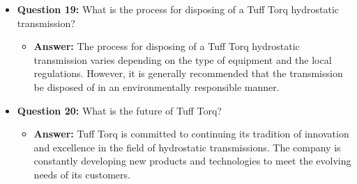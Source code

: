 \documentclass{article}
\begin{document}
\begin{itemize}
    \item \textbf{Question 19:} What is the process for disposing of a Tuff Torq hydrostatic transmission?
    \begin{itemize}
        \item \textbf{Answer:} The process for disposing of a Tuff Torq hydrostatic transmission varies depending on the type of equipment and the local regulations. However, it is generally recommended that the transmission be disposed of in an environmentally responsible manner.
    \end{itemize}
    
    \item \textbf{Question 20:} What is the future of Tuff Torq?
    \begin{itemize}
        \item \textbf{Answer:} Tuff Torq is committed to continuing its tradition of innovation and excellence in the field of hydrostatic transmissions. The company is constantly developing new products and technologies to meet the evolving needs of its customers.
    \end{itemize}
\end{itemize}
\end{document}
